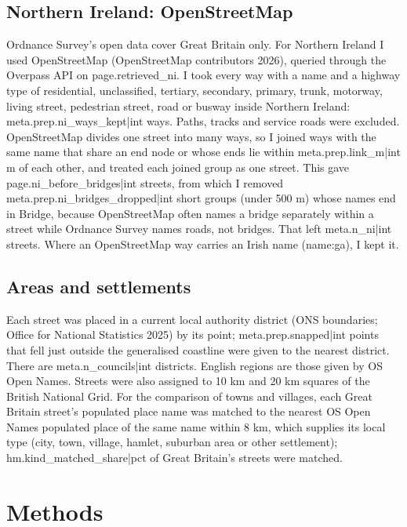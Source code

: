 \documentclass[11pt,a4paper]{article}
\begin{document}
\subsection{Northern Ireland: OpenStreetMap}

Ordnance Survey's open data cover Great Britain only. For Northern Ireland I used OpenStreetMap (OpenStreetMap contributors 2026), queried through the Overpass API on {{page.retrieved_ni}}. I took every way with a name and a highway type of residential, unclassified, tertiary, secondary, primary, trunk, motorway, living street, pedestrian street, road or busway inside Northern Ireland: {{meta.prep.ni_ways_kept|int}} ways. Paths, tracks and service roads were excluded. OpenStreetMap divides one street into many ways, so I joined ways with the same name that share an end node or whose ends lie within {{meta.prep.link_m|int}} m of each other, and treated each joined group as one street. This gave {{page.ni_before_bridges|int}} streets, from which I removed {{meta.prep.ni_bridges_dropped|int}} short groups (under 500 m) whose names end in Bridge, because OpenStreetMap often names a bridge separately within a street while Ordnance Survey names roads, not bridges. That left {{meta.n_ni|int}} streets. Where an OpenStreetMap way carries an Irish name (name:ga), I kept it.

\subsection{Areas and settlements}

Each street was placed in a current local authority district (ONS boundaries; Office for National Statistics 2025) by its point; {{meta.prep.snapped|int}} points that fell just outside the generalised coastline were given to the nearest district. There are {{meta.n_councils|int}} districts. English regions are those given by OS Open Names. Streets were also assigned to 10 km and 20 km squares of the British National Grid. For the comparison of towns and villages, each Great Britain street's populated place name was matched to the nearest OS Open Names populated place of the same name within 8 km, which supplies its local type (city, town, village, hamlet, suburban area or other settlement); {{hm.kind_matched_share|pct}} of Great Britain's streets were matched.

\section{Methods}
\end{document}
